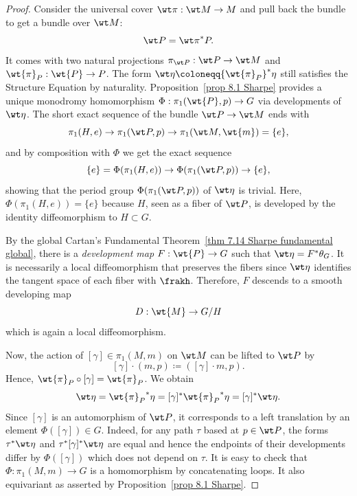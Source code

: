 \begin{proof}
    Consider the universal cover $\wt\pi:\wt M\to M$ and pull back the bundle to get a bundle over $\wt M$:
    \[\wt P={\wt\pi}^\ast P.\]
    It comes with two natural projections $\pi_{\wt P}:\wt P\to \wt M$ and $\wt{\pi}_P:\wt{P}\to P$. The form $\wt\eta\coloneqq {\wt{\pi}_P}^\ast\eta$ still satisfies the Structure Equation by naturality. Proposition~\ref{prop 8.1 Sharpe} provides a unique monodromy homomorphism $\Phi:\pi_1(\wt{P},p)\to G$ via developments of $\wt\eta$. The short exact sequence of the bundle $\wt P\to \wt M$ ends with
    \[\pi_1(H,e)\to \pi_1(\wt P,p)\to \pi_1(\wt M,\wt{m})=\{e\},\]
    and by composition with $\Phi$ we get the exact sequence 
    \[\{e\}=\Phi(\pi_1(H,e))\to \Phi(\pi_1(\wt P,p))\to \{e\},\]
    showing that the period group $\Phi(\pi_1(\wt P,p))$ of $\wt\eta$ is trivial. Here, $\Phi(\pi_1(H,e))=\{e\}$ because $H$, seen as a fiber of $\wt P$, is developed by the identity diffeomorphism to $H\subset G$.

    By the global Cartan's Fundamental Theorem~\ref{thm 7.14 Sharpe fundamental global}, there is a \emph{development map} $F:\wt{P}\to G$ such that $\wt\eta=F^\ast\theta_G$. It is necessarily a local diffeomorphism that preserves the fibers since $\wt\eta$ identifies the tangent space of each fiber with $\frakh$. Therefore, $F$ descends to a smooth developing map 
    \[D:\wt{M}\to G\slash H\]
    which is again a local diffeomorphism. 

    Now, the action of $[\gamma]\in \pi_1(M,m)$ on $\wt M$ can be lifted to $\wt P$ by
    \[[\gamma]\cdot (m,p)\coloneqq ([\gamma]\cdot m,p).\]
    Hence, $\wt{\pi}_P\circ [\gamma]=\wt{\pi}_P$. We obtain
    \[\wt\eta={\wt{\pi}_P}^\ast \eta=[\gamma]^\ast {\wt{\pi}_P}^\ast \eta=[\gamma]^\ast\wt\eta.\]
    Since $[\gamma]$ is an automorphism of $\wt P$, it corresponds to a left translation by an element $\Phi([\gamma])\in G$. Indeed, for any path $\tau$ based at $p\in\wt P$, the forms $\tau^\ast\wt\eta$ and $\tau^\ast[\gamma]^\ast\wt\eta$ are equal and hence the endpoints of their developments differ by $\Phi([\gamma])$ which does not depend on $\tau$. It is easy to check that $\Phi:\pi_1(M,m)\to G$ is a homomorphism by concatenating loops. It also equivariant as asserted by Proposition~\ref{prop 8.1 Sharpe}.


\end{proof}

